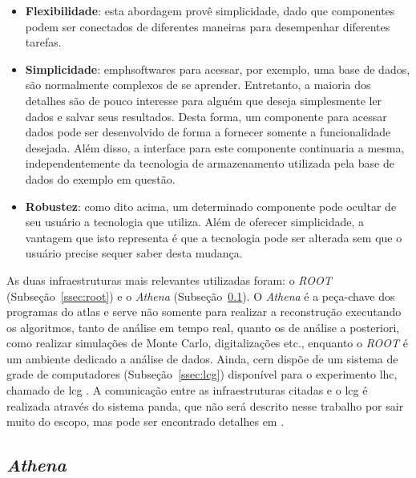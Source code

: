 \begin{itemize}
\item \textbf{Flexibilidade}: esta abordagem provê simplicidade, dado que componentes podem
ser conectados de diferentes maneiras para desempenhar diferentes tarefas.
\item \textbf{Simplicidade}: emph{softwares} para acessar, por exemplo, uma base de dados, são
normalmente complexos de se aprender. Entretanto, a maioria dos detalhes são de
pouco interesse para alguém que deseja simplesmente ler dados e salvar seus
resultados. Desta forma, um componente para acessar dados pode ser desenvolvido
de forma a fornecer somente a funcionalidade desejada. Além disso, a interface
para este componente continuaria a mesma, independentemente da tecnologia de
armazenamento utilizada pela base de dados do exemplo em questão.
\item \textbf{Robustez}: como dito acima, um determinado componente pode ocultar de seu
usuário a tecnologia que utiliza. Além de oferecer simplicidade, a vantagem que
isto representa é que a tecnologia pode ser alterada sem que o usuário precise
sequer saber desta mudança.
\end{itemize}



As duas infraestruturas mais relevantes utilizadas foram: o \emph{ROOT}
(Subseção~\ref{ssec:root}) e o \emph{Athena} (Subseção~\ref{ssec:athena}). 
O \emph{Athena} é a peça-chave dos programas do \gls{atlas} e serve não somente
para realizar a reconstrução executando os algoritmos, tanto de análise em tempo
real, quanto os de análise a posteriori, como realizar simulações de Monte Carlo, digitalizações etc., 
enquanto o \emph{ROOT} é um ambiente dedicado a análise de dados. 
Ainda, \gls{cern} dispõe de um sistema de grade de 
computadores (Subseção~\ref{ssec:lcg}) disponível para o experimento \gls{lhc}, chamado de \gls{lcg} 
\cite{grid}. A comunicação entre as infraestruturas citadas e o \gls{lcg} é realizada através do sistema
\gls{panda}, que não será descrito nesse trabalho por sair muito do escopo, 
mas pode ser encontrado detalhes em \cite{panda}.

\subsection{\emph{Athena}}
\label{ssec:athena}



